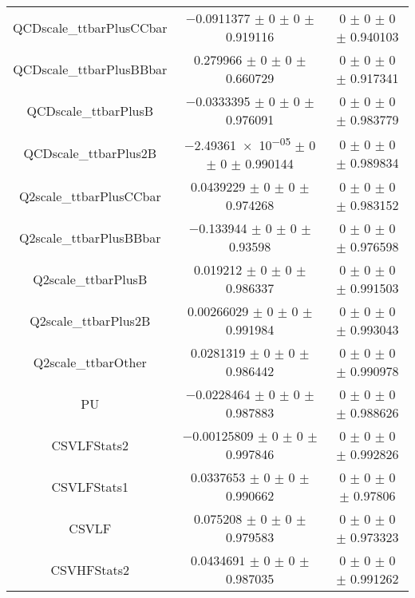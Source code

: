 \begin{table}
\begin{tabular}{ccc}
QCDscale\_ttbarPlusCCbar & \num{-0.0911377} $\pm$ \num{0} $\pm$ \num{0} $\pm$ \num{0.919116} & \num{0} $\pm$ \num{0} $\pm$ \num{0} $\pm$ \num{0.940103}\\
QCDscale\_ttbarPlusBBbar & \num{0.279966} $\pm$ \num{0} $\pm$ \num{0} $\pm$ \num{0.660729} & \num{0} $\pm$ \num{0} $\pm$ \num{0} $\pm$ \num{0.917341}\\
QCDscale\_ttbarPlusB & \num{-0.0333395} $\pm$ \num{0} $\pm$ \num{0} $\pm$ \num{0.976091} & \num{0} $\pm$ \num{0} $\pm$ \num{0} $\pm$ \num{0.983779}\\
QCDscale\_ttbarPlus2B & \num{-2.49361e-05} $\pm$ \num{0} $\pm$ \num{0} $\pm$ \num{0.990144} & \num{0} $\pm$ \num{0} $\pm$ \num{0} $\pm$ \num{0.989834}\\
Q2scale\_ttbarPlusCCbar & \num{0.0439229} $\pm$ \num{0} $\pm$ \num{0} $\pm$ \num{0.974268} & \num{0} $\pm$ \num{0} $\pm$ \num{0} $\pm$ \num{0.983152}\\
Q2scale\_ttbarPlusBBbar & \num{-0.133944} $\pm$ \num{0} $\pm$ \num{0} $\pm$ \num{0.93598} & \num{0} $\pm$ \num{0} $\pm$ \num{0} $\pm$ \num{0.976598}\\
Q2scale\_ttbarPlusB & \num{0.019212} $\pm$ \num{0} $\pm$ \num{0} $\pm$ \num{0.986337} & \num{0} $\pm$ \num{0} $\pm$ \num{0} $\pm$ \num{0.991503}\\
Q2scale\_ttbarPlus2B & \num{0.00266029} $\pm$ \num{0} $\pm$ \num{0} $\pm$ \num{0.991984} & \num{0} $\pm$ \num{0} $\pm$ \num{0} $\pm$ \num{0.993043}\\
Q2scale\_ttbarOther & \num{0.0281319} $\pm$ \num{0} $\pm$ \num{0} $\pm$ \num{0.986442} & \num{0} $\pm$ \num{0} $\pm$ \num{0} $\pm$ \num{0.990978}\\
PU & \num{-0.0228464} $\pm$ \num{0} $\pm$ \num{0} $\pm$ \num{0.987883} & \num{0} $\pm$ \num{0} $\pm$ \num{0} $\pm$ \num{0.988626}\\
CSVLFStats2 & \num{-0.00125809} $\pm$ \num{0} $\pm$ \num{0} $\pm$ \num{0.997846} & \num{0} $\pm$ \num{0} $\pm$ \num{0} $\pm$ \num{0.992826}\\
CSVLFStats1 & \num{0.0337653} $\pm$ \num{0} $\pm$ \num{0} $\pm$ \num{0.990662} & \num{0} $\pm$ \num{0} $\pm$ \num{0} $\pm$ \num{0.97806}\\
CSVLF & \num{0.075208} $\pm$ \num{0} $\pm$ \num{0} $\pm$ \num{0.979583} & \num{0} $\pm$ \num{0} $\pm$ \num{0} $\pm$ \num{0.973323}\\
CSVHFStats2 & \num{0.0434691} $\pm$ \num{0} $\pm$ \num{0} $\pm$ \num{0.987035} & \num{0} $\pm$ \num{0} $\pm$ \num{0} $\pm$ \num{0.991262}\\

\end{tabular}
\end{table}
